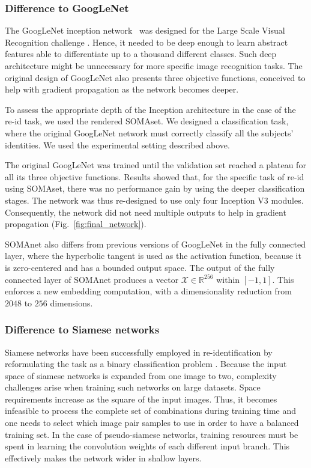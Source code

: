 \documentclass[10pt,journal,letterpaper,compsoc]{IEEEtran}
\begin{document}
\subsubsection{Difference to GoogLeNet}
\label{sec:DiffGoog}

The GoogLeNet inception network~\cite{googlenet, batch_norm, incep3} was designed for the Large Scale Visual Recognition challenge \cite{imagenet}. Hence, it needed to be deep enough to learn abstract features able to differentiate up to a thousand different classes. Such deep architecture might be unnecessary for more specific image recognition tasks.  The original design of GoogLeNet also presents three objective functions,
conceived to help with gradient propagation as the network becomes deeper.

To assess the appropriate depth of the Inception architecture in the case of the re-id task, we used the rendered SOMAset. We designed a classification task, where the original GoogLeNet network must correctly classify all the subjects' identities.
We used the experimental setting described
above.

The original GoogLeNet was trained until the validation set reached a plateau for all its three objective functions. Results showed that, for the specific task of re-id using SOMAset, there was no performance gain by using the deeper classification stages. The network was thus re-designed to use only four Inception V3 modules. Consequently, the network did not need multiple outputs to help in gradient propagation (Fig.~\ref{fig:final_network}).

SOMAnet also differs from previous versions of GoogLeNet in the fully connected layer, where the hyperbolic tangent is used as the activation function, because it is zero-centered and has a bounded output space. The output of the fully connected layer of SOMAnet produces a vector $\mathcal{X} \in \mathbb{R}^{256}$ within $[-1,1]$. This enforces a new embedding computation, with a dimensionality reduction from $2048$ to $256$ dimensions.


\subsubsection{Difference to Siamese networks}
\label{sec:DiffSiam}

Siamese networks have been successfully employed in re-identification by reformulating the task as a binary classification problem \cite{li2014deepreid,Ahmed15}.
Because the input space of siamese networks is expanded from one image to two, complexity challenges arise when training such  networks on large datasets. Space requirements increase as the square of the input images.
Thus, it becomes infeasible to process the complete set of combinations during training time and one needs to select which image pair samples to use in order to have a balanced training set.
In the case of pseudo-siamese networks, training resources must be spent in learning the convolution weights of each different input branch. This effectively makes the network wider in shallow layers.
\end{document}
